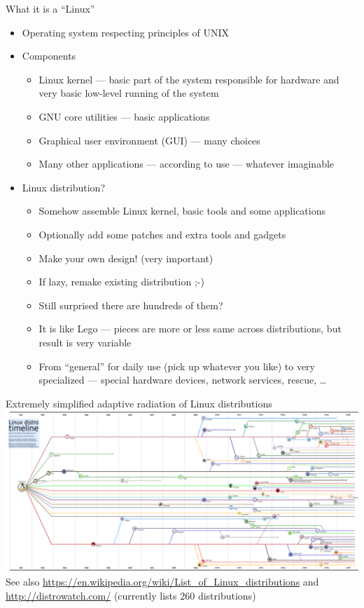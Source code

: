 \documentclass[hyperref={bookmarks=true, unicode=true, colorlinks=true, pdftitle={Linux, command line and MetaCentrum}, plainpages=false, pdfauthor={Vojtech Zeisek}, pdfsubject={Course about use of Linux command line, writing shell scripts and using MetaCentrum of CESNET}, pdfcreator={XeLaTeX, http://www.xelatex.org/}, pdfkeywords={Linux, GNU, BASH, shell, command line, MetaCentrum}, linkcolor=Sienna, anchorcolor=black, citecolor=green, filecolor=magenta, menucolor=Sienna, urlcolor=cyan, pdftex}, compress, ucs, xelatex, xcolor=svgnames, 11pt]{beamer}
\begin{document}
\begin{frame}{What it is a ``Linux''}
\begin{itemize}
  \item Operating system respecting principles of UNIX
  \item Components
  \begin{itemize}
    \item Linux kernel --- basic part of the system responsible for hardware and very basic low-level running of the system
    \item GNU core utilities --- basic applications
    \item Graphical user environment (GUI) --- many choices
    \item Many other applications --- according to use --- whatever imaginable
  \end{itemize}
  \item Linux distribution?
  \begin{itemize}
    \item Somehow assemble Linux kernel, basic tools and some applications
    \item Optionally add some patches and extra tools and gadgets
    \item Make your own design! (very important)
    \item If lazy, remake existing distribution ;-)
    \item Still surprised there are hundreds of them?
    \item It is like Lego --- pieces are more or less same across distributions, but result is very variable
    \item From ``general'' for daily use (pick up whatever you like) to very specialized --- special hardware devices, network services, rescue, \ldots
  \end{itemize}
\end{itemize}
\end{frame}

\begin{frame}{Extremely simplified adaptive radiation of Linux distributions}
\includegraphics[width=\textwidth]{linux_fylogen_2.png}\\
See also \href{https://en.wikipedia.org/wiki/List_of_Linux_distributions}{https://en.wikipedia.org/wiki/List\_of\_Linux\_distributions} and \href{http://distrowatch.com/http://distrowatch.com/}{http://distrowatch.com/} (currently lists 260 distributions)
\end{frame}
\end{document}
